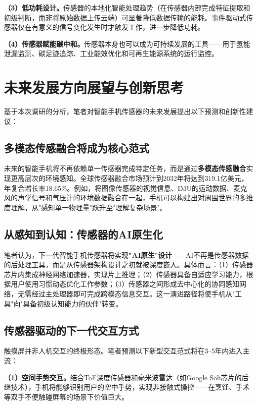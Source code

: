 \documentclass[12pt, a4paper]{ctexart}
\begin{document}
\textbf{（3）低功耗设计。}传感器的本地化智能处理趋势（在传感器内部完成特征提取和初级判断，而非将原始数据上传云端）可显著降低数据传输的能耗。事件驱动式传感器仅在有意义的信号变化发生时才触发工作，进一步降低功耗。

\textbf{（4）传感器赋能碳中和。}传感器本身也可以成为可持续发展的工具——用于氢能泄漏监测、碳足迹追踪、工业能效优化和可再生能源系统的运行监控\cite{innosensor2025}。


\section{未来发展方向展望与创新思考}

基于本次调研的分析，笔者对智能手机传感器的未来发展提出以下预测和创新性建议：

\subsection{多模态传感融合将成为核心范式}

未来的智能手机将不再依赖单一传感器完成特定任务，而是通过\textbf{多模态传感融合}实现更高层次的环境感知。全球传感器融合市场预计到2032年将达到319.1亿美元，年复合增长率18.65\%\cite{innosensor2025}。例如，将图像传感器的视觉信息、IMU的运动数据、麦克风的声学信号和气压计的环境数据融合在一起，手机可以构建出对周围世界的多维度理解，从"感知单一物理量"跃升至"理解复杂场景"。

\subsection{从感知到认知：传感器的AI原生化}

笔者认为，下一代智能手机传感器将实现\textbf{"AI原生"设计}——AI不再是传感器数据的后处理工具，而是从传感器架构设计之初就被深度嵌入。具体而言：（1）传感器芯片内集成神经网络加速器，实现片上推理；（2）传感器具备自适应学习能力，根据用户使用习惯动态优化工作参数；（3）传感器之间形成去中心化的协同感知网络，无需经过主处理器即可完成跨模态信息交互。这一演进路径将使手机从"工具"向"具备初级认知能力的伙伴"转变。

\subsection{传感器驱动的下一代交互方式}

触摸屏并非人机交互的终极形态。笔者预测以下新型交互范式将在3--5年内进入主流：

\textbf{（1）空间手势交互。}结合ToF深度传感器和毫米波雷达（如Google Soli芯片的后继技术），手机将能够识别用户的空中手势，实现非接触式操控——在烹饪、手术等双手不便触碰屏幕的场景下价值巨大。
\end{document}
